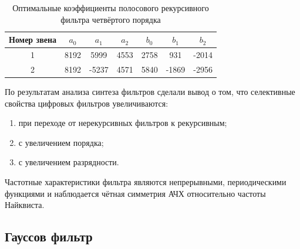 \begin{table}[H]
\centering
\caption{Оптимальные  коэффициенты  полосового  рекурсивного  фильтра  четвёртого порядка}
\vspace{0.5em}
\begin{tabular}{|c|c|c|c|c|c|c|}
\hline
Номер звена & $a_0$ & $a_1$ & $a_2$ & $b_0$ & $b_1$ & $b_2$ \\ \hline
1           & 8192    & 5999    & 4553    & 2758   & 931     & -2014    \\ \hline
2           & 8192    & -5237   & 4571    & 5840   & -1869   & -2956    \\ \hline
\end{tabular}
\end{table}
По результатам анализа синтеза фильтров сделали вывод о том, что селективные свойства цифровых фильтров увеличиваются:
\begin{enumerate}
  \vspace{-0.6em}
  \item при переходе от нерекурсивных фильтров к рекурсивным;\\[-1.8em]
  \item с увеличением порядка;\\[-1.8em]
  \item с увеличением разрядности.\\[-1.8em]
\end{enumerate}

Частотные характеристики фильтра являются непрерывными, периодическими функциями и наблюдается чётная симметрия АЧХ относительно частоты Найквиста.

\subsection{Гауссов фильтр}
